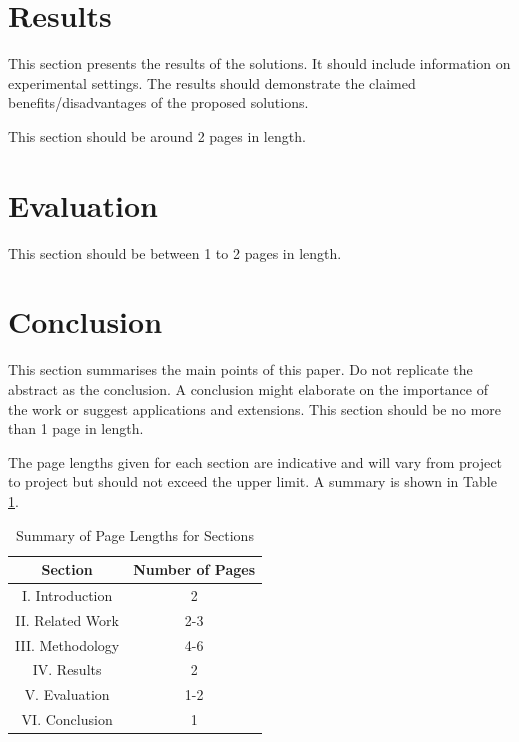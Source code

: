 \documentclass[10pt,journal,compsoc]{IEEEtran}
\begin{document}
\section{Results}
This section presents the results of the solutions. It should include information on experimental settings. The results should demonstrate the claimed benefits/disadvantages of the proposed solutions.

This section should be around 2 pages in length.

\section{Evaluation}
This section should be between 1 to 2 pages in length.

\section{Conclusion}
This section summarises the main points of this paper. Do not replicate the abstract as the conclusion. A conclusion might elaborate on the importance of the work or suggest applications and extensions. This section should be no more than 1 page in length.

The page lengths given for each section are indicative and will vary from project to project but should not exceed the upper limit. A summary is shown in Table \ref{table_2}.

\begin{table}[!t]
\renewcommand{\arraystretch}{1.3}
\caption{Summary of Page Lengths for Sections}
\label{table_2}
\centering
\begin{tabular}{cc}
\hline\hline
Section & Number of Pages\\
\hline
I. Introduction & 2\\
II. Related Work & 2-3\\
III. Methodology & 4-6\\
IV. Results & 2\\
V. Evaluation & 1-2\\
VI. Conclusion & 1\\
\hline\hline
\end{tabular}
\end{table}


\end{document}
